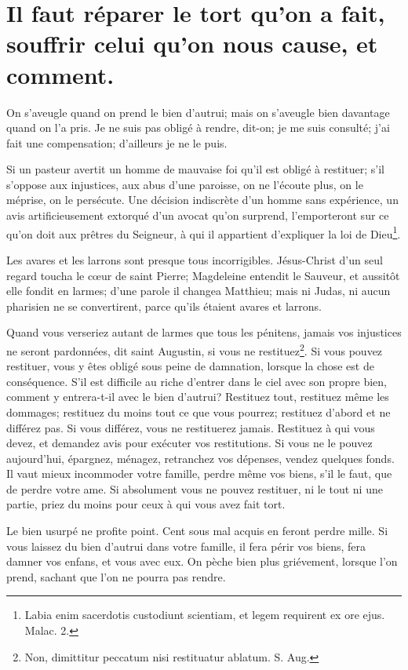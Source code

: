 \documentclass[instructions.tex]{subfiles}
\begin{document}
 
\chapter{Il faut réparer le tort qu’on a fait, souffrir celui qu’on nous cause, et comment.}
 
\primo On s’aveugle quand on prend le bien d’autrui; mais on s’aveugle bien davantage quand on l’a pris. Je ne suis pas obligé à rendre, dit-on; je me suis consulté; j’ai fait une compensation; d’ailleurs je ne le puis.
 
Si un pasteur avertit un homme de mauvaise foi qu’il est obligé à restituer; s’il s’oppose aux injustices, aux abus d’une paroisse, on ne l’écoute plus, on le méprise, on le persécute. Une décision indiscrète d’un homme sans expérience, un avis artificieusement extorqué d’un avocat qu’on surprend, l’emporteront sur ce qu’on doit aux prêtres du Seigneur, à qui il appartient d’expliquer la loi de Dieu\footnote{Labia enim sacerdotis custodiunt scientiam, et legem requirent ex ore ejus. Malac. 2.}.
 
Les avares et les larrons sont presque tous incorrigibles. Jésus-Christ d’un seul regard toucha le cœur de saint Pierre; Magdeleine entendit le Sauveur, et aussitôt elle fondit en larmes; d’une parole il changea Matthieu; mais ni Judas, ni aucun pharisien ne se convertirent, parce qu’ils étaient avares et larrons.
 
Quand vous verseriez autant de larmes que tous les pénitens, jamais vos injustices ne seront pardonnées, dit saint Augustin, si vous ne restituez\footnote{Non, dimittitur peccatum nisi restituatur ablatum. S. Aug.}. Si vous pouvez restituer, vous y êtes obligé sous peine de damnation, lorsque la chose est de conséquence. S’il est difficile au riche d’entrer dans le ciel avec son propre bien, comment y entrera-t-il avec le bien d’autrui? Restituez tout, restituez même les dommages; restituez du moins tout ce que vous pourrez; restituez d’abord et ne différez pas. Si vous différez, vous ne restituerez jamais. Restituez à qui vous devez, et demandez avis pour exécuter vos restitutions. Si vous ne le pouvez aujourd’hui, épargnez, ménagez, retranchez vos dépenses, vendez quelques fonds. Il vaut mieux incommoder votre famille, perdre même vos biens, s’il le faut, que de perdre votre ame. Si absolument vous ne pouvez restituer, ni le tout ni une partie, priez du moins pour ceux à qui vous avez fait tort.
 
Le bien usurpé ne profite point. Cent sous mal acquis en feront perdre mille. Si vous laissez du bien d’autrui dans votre famille, il fera périr vos biens, fera damner vos enfans, et vous avec eux. On pèche bien plus griévement, lorsque l’on prend, sachant que l’on ne pourra pas rendre.
 
\end{document}
